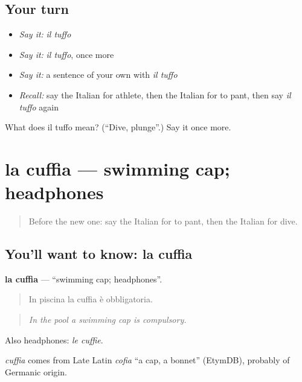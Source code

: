 \subsection*{Your turn}
\begin{itemize}
\raggedright
  \item \emph{Say it:} \emph{il tuffo}
  \item \emph{Say it:} \emph{il tuffo}, once more
  \item \emph{Say it:} a sentence of your own with \emph{il tuffo}
  \item \emph{Recall:} say the Italian for athlete, then the Italian for to pant, then say \emph{il tuffo} again
\end{itemize}

\begin{tcolorbox}[breakable,colback=teal!4,colframe=teal!35!black,title={Before you move on}]
What does il tuffo mean? (\textquotedblleft{}Dive, plunge\textquotedblright{}.) Say it once more.
\end{tcolorbox}
\section[la cuffia]{la cuffia — swimming cap; headphones}

\label{lesson:IT-C514-cuffia}



\begin{quote}
Before the new one: say the Italian for to pant, then the Italian for dive.
\end{quote}

\subsection*{You'll want to know: la cuffia}
\textbf{la cuffia} — \textquotedblleft{}swimming cap; headphones\textquotedblright{}.

\begin{quote}
In piscina la cuffia è obbligatoria.
\end{quote}

\begin{quote}
\emph{In the pool a swimming cap is compulsory.}
\end{quote}

Also headphones: \emph{le cuffie}.

\begin{cousinweb}
\emph{cuffia} comes from Late Latin \emph{cofia} \textquotedblleft{}a cap, a bonnet\textquotedblright{} (EtymDB), probably of Germanic origin.
\end{cousinweb}

